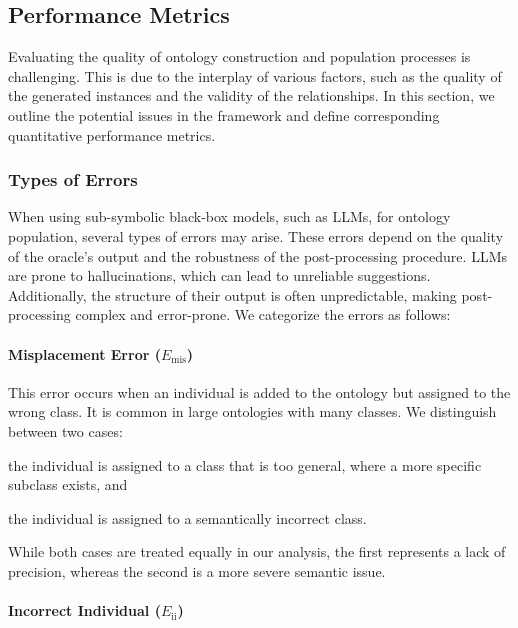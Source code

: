


\subsection{Performance Metrics}
\label{subsec:performance-metrics}
%
Evaluating the quality of ontology construction and population processes is challenging.
%
This is due to the interplay of various factors, such as the quality of the generated instances and the validity of the relationships.
%
In this section, we outline the potential issues in the \llmfkg{} framework and define corresponding quantitative performance metrics.


\subsubsection{Types of Errors}
\label{subsubsec:error_types}
%
When using sub-symbolic black-box models, such as \glspl{LLM}, for ontology population, several types of errors may arise.
%
These errors depend on the quality of the oracle's output and the robustness of the post-processing procedure.
%
\glspl{LLM} are prone to hallucinations, which can lead to unreliable suggestions.
%
Additionally, the structure of their output is often unpredictable, making post-processing complex and error-prone.
%
We categorize the errors as follows:

%
\paragraph{Misplacement Error (\(E_{\text{mis}}\))}

This error occurs when an individual is added to the ontology but assigned to the wrong class.
%
It is common in large ontologies with many classes.
%
We distinguish between two cases:
%
\begin{inlinelist}
    \item the individual is assigned to a class that is too general, where a more specific subclass exists, and
    \item the individual is assigned to a semantically incorrect class.
\end{inlinelist}
%
While both cases are treated equally in our analysis, the first represents a lack of precision, whereas the second is a more severe semantic issue.

%
\paragraph{Incorrect Individual (\(E_{\text{ii}}\))}


